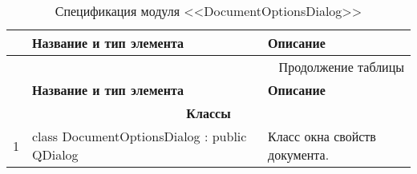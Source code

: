 \small
\singlespacing
\begin{longtable}[h]{|p{}|p{}|p{}|}
  \caption{Спецификация модуля <<DocumentOptionsDialog>>}
	\\ \hline
	  \textbf{\No}                  &
	  \textbf{Название и тип элемента}  &
	  \textbf{Описание}
	\\ \hline
  \endfirsthead

  \multicolumn{3}{r}{Продолжение таблицы \thetable{}}
  \\ \hline
	  \textbf{\No}                  &
	  \textbf{Название и тип элемента}  &
	  \textbf{Описание}
	\\ \hline
  \endhead

  \multicolumn{3}{|c|}{\textbf{Классы}} \\
  \hline
  1 & class DocumentOptionsDialog : public QDialog & Класс окна свойств документа. \\ \hline
\end{longtable}
\normalsize
\onehalfspacing


